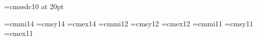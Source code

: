\def\ST#1{\font\tempfont="\song" at #1pt\letfont\tempfont}
\def\HT#1{\font\tempfont="\hei" at #1pt\letfont\tempfont}
\def\KT#1{\font\tempfont="\kai" at #1pt\letfont\tempfont}
\def\FS#1{\font\tempfont="\fang" at #1pt\letfont\tempfont}
\def\YY#1{\font\tempfont="\yuan" at #1pt\letfont\tempfont}


\font\titlefonta=cmssdc10 at 20pt

\font\fourteeni=cmmi14
\font\fourteensy=cmsy14
\font\fourteenex=cmex14
\def\fourteenpoint{\def\rm{\fam0\fourteenrm}%
  \textfont0=\fourteenrm \scriptfont0=\elevenrm \scriptscriptfont0=\ninerm
  \textfont1=\fourteeni \scriptfont1=\eleveni \scriptscriptfont1=\ninei
  \textfont2=\fourteensy \scriptfont2=\elevensy \scriptscriptfont2=\ninesy
  \textfont3=\fourteenex \scriptfont3=\fourteenex \scriptscriptfont3=\fourteenex
  \def\it{\fam\itfam\fourteenit}%
  \textfont\itfam=\fourteenit
  \def\sl{\fam\slfam\fourteensl}%
  \textfont\slfam=\fourteensl
  \def\bf{\fam\bffam\fourteenbf}%
  \textfont\bffam=\fourteenbf \scriptfont\bffam=\elevenbf
   \scriptscriptfont\bffam=\ninebf
  \def\tt{\fam\ttfam\fourteentt}%
  \textfont\ttfam=\fourteentt
  \tt \ttglue=.5em plus.25em minus.15em
  \normalbaselineskip=23pt
  \def\MF{{\manual META}\-{\manual FONT}}%
  \let\sc=\elevenrm
  \let\big=\fourteenbig
  \setbox\strutbox=\hbox{\vrule height10.5pt depth5.5pt width\z@}%
  \normalbaselines\rm}
%
\font\twelvei=cmmi12
\font\twelvesy=cmsy12
\font\twelveex=cmex12
\def\twelvepoint{\def\rm{\fam0\twelverm}%
  \textfont0=\twelverm \scriptfont0=\ninerm \scriptscriptfont0=\sevenrm
  \textfont1=\twelvei \scriptfont1=\ninei \scriptscriptfont1=\seveni
  \textfont2=\twelvesy \scriptfont2=\ninesy \scriptscriptfont2=\sevensy
  \textfont3=\twelveex \scriptfont3=\twelveex \scriptscriptfont3=\twelveex
  \def\it{\fam\itfam\twelveit}%
  \textfont\itfam=\twelveit
  \def\sl{\fam\slfam\twelvesl}%
  \textfont\slfam=\twelvesl
  \def\bf{\fam\bffam\twelvebf}%
  \textfont\bffam=\twelvebf \scriptfont\bffam=\ninebf
   \scriptscriptfont\bffam=\sevenbf
  \def\tt{\fam\ttfam\twelvett}%
  \textfont\ttfam=\twelvett
  \tt \ttglue=.5em plus.25em minus.15em
  \normalbaselineskip=19pt
  \def\MF{{\manual META}\-{\manual FONT}}%
  \let\sc=\ninerm
  \let\big=\twelvebig
  \setbox\strutbox=\hbox{\vrule height9.5pt depth4.5pt width\z@}%
  \normalbaselines\rm}
%
\font\eleveni=cmmi11
\font\elevensy=cmsy11
\font\elevenex=cmex11
\def\elevenpoint{\def\rm{\fam0\elevenrm}%
  \textfont0=\elevenrm \scriptfont0=\eightrm \scriptscriptfont0=\sixrm
  \textfont1=\eleveni \scriptfont1=\eighti \scriptscriptfont1=\sixi
  \textfont2=\elevensy \scriptfont2=\eightsy \scriptscriptfont2=\sixsy
  \textfont3=\elevenex \scriptfont3=\elevenex \scriptscriptfont3=\elevenex
  \def\it{\fam\itfam\elevenit}%
  \textfont\itfam=\elevenit
  \def\sl{\fam\slfam\elevensl}%
  \textfont\slfam=\elevensl
  \def\bf{\fam\bffam\elevenbf}%
  \textfont\bffam=\elevenbf \scriptfont\bffam=\eightbf
   \scriptscriptfont\bffam=\sixbf
  \def\tt{\fam\ttfam\eleventt}%
  \textfont\ttfam=\eleventt
  \tt \ttglue=.5em plus.25em minus.15em
  \normalbaselineskip=16pt
  \def\MF{{\manual META}\-{\manual FONT}}%
  \let\sc=\eightrm
  \let\big=\elevenbig
  \setbox\strutbox=\hbox{\vrule height9pt depth4pt width\z@}%
  \normalbaselines\rm}
